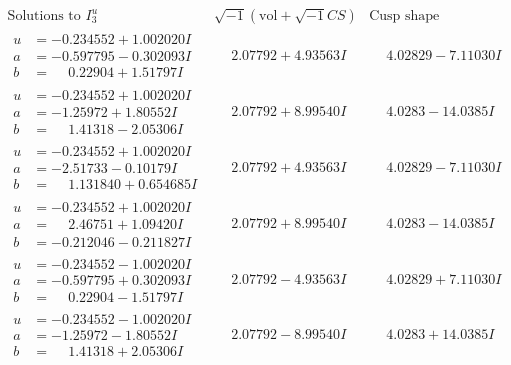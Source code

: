 \documentclass[1p]{elsarticle_modified}
\theoremstyle{definition}
\newcommand{\I}{\sqrt{-1}}
\begin{document}
$$\begin{array}{c|c|c}  
\text{Solutions to }I^u_{3}& \I (\text{vol} + \sqrt{-1}CS) & \text{Cusp shape}\\
 \hline 
\begin{aligned}
u &= -0.234552 + 1.002020 I \\
a &= -0.597795 - 0.302093 I \\
b &= \phantom{-}0.22904 + 1.51797 I\end{aligned}
 & \phantom{-}2.07792 + 4.93563 I & \phantom{-}4.02829 - 7.11030 I \\ \hline\begin{aligned}
u &= -0.234552 + 1.002020 I \\
a &= -1.25972 + 1.80552 I \\
b &= \phantom{-}1.41318 - 2.05306 I\end{aligned}
 & \phantom{-}2.07792 + 8.99540 I & \phantom{-}4.0283 - 14.0385 I \\ \hline\begin{aligned}
u &= -0.234552 + 1.002020 I \\
a &= -2.51733 - 0.10179 I \\
b &= \phantom{-}1.131840 + 0.654685 I\end{aligned}
 & \phantom{-}2.07792 + 4.93563 I & \phantom{-}4.02829 - 7.11030 I \\ \hline\begin{aligned}
u &= -0.234552 + 1.002020 I \\
a &= \phantom{-}2.46751 + 1.09420 I \\
b &= -0.212046 - 0.211827 I\end{aligned}
 & \phantom{-}2.07792 + 8.99540 I & \phantom{-}4.0283 - 14.0385 I \\ \hline\begin{aligned}
u &= -0.234552 - 1.002020 I \\
a &= -0.597795 + 0.302093 I \\
b &= \phantom{-}0.22904 - 1.51797 I\end{aligned}
 & \phantom{-}2.07792 - 4.93563 I & \phantom{-}4.02829 + 7.11030 I \\ \hline\begin{aligned}
u &= -0.234552 - 1.002020 I \\
a &= -1.25972 - 1.80552 I \\
b &= \phantom{-}1.41318 + 2.05306 I\end{aligned}
 & \phantom{-}2.07792 - 8.99540 I & \phantom{-}4.0283 + 14.0385 I \\ \hline\begin{aligned}

\end{aligned}
\end{array}$$
\end{document}
